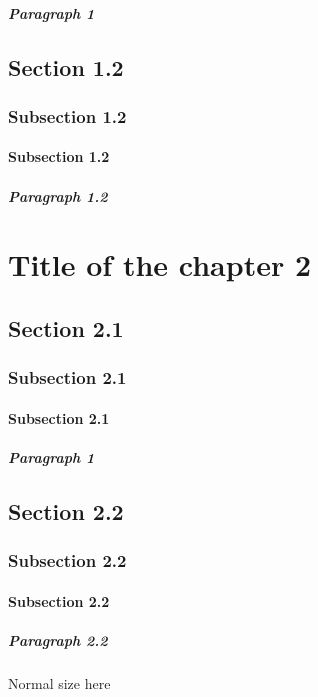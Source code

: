 \documentclass[11pt,a4paper,twoside]{book}
\begin{document}
	\paragraph{Paragraph 1}
	\lipsum[1-15]
	
	\section{Section 1.2}
	\subsection{Subsection 1.2}
	\subsubsection{Subsection 1.2}
	\paragraph{Paragraph 1.2}
	
	\chapter{Title of the chapter 2}
	\minitoc %
	\section{Section 2.1}
	\subsection{Subsection 2.1}
	\subsubsection{Subsection 2.1}
	\paragraph{Paragraph 1}
	\section{Section 2.2}
	\subsection{Subsection 2.2}
	\subsubsection{Subsection 2.2}
	\paragraph{Paragraph 2.2}
	Normal size here
	
\end{document}
